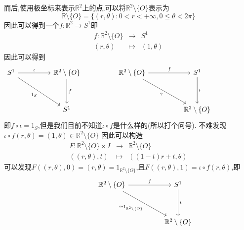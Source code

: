 \documentclass{article}
\begin{document}
\begin{example}
    而后,使用极坐标来表示$\mathbb{R}^2$上的点,可以将$\mathbb{R}^2 \setminus\{O\}$表示为
    $$
    \mathbb{R}\setminus\{O\} = \{(r,\theta): 0 < r <+\infty,0\leq \theta <2\pi\}
    $$
    因此可以得到一个$f : \mathbb{R}^2 \to S^1$即
    \begin{eqnarray*}
        f : \mathbb{R}^2\setminus\{O\} &\to& S^1\\
        (r,\theta) &\mapsto& (1,\theta)
        \end{eqnarray*}
    因此可以得到
    \[\begin{tikzcd}
	{S^1} && {\mathbb{R}^2\setminus\{O\}} && {\mathbb{R}^2\setminus\{O\}} && {S^1} \\
	\\
	&& {S^1} &&&& {\mathbb{R}^2\setminus\{O\}} 
	&& {}
	\arrow["f", from=1-3, to=3-3]
	\arrow["\iota", from=1-1, to=1-3]
	\arrow["{1_{S}}"', from=1-1, to=3-3]
	\arrow["f", from=1-5, to=1-7]
	\arrow["\iota", from=1-7, to=3-7]
	\arrow["{?}"', from=1-5, to=3-7]
\end{tikzcd}\]
    即$f \circ \iota = 1_S$,但是我们目前不知道$\iota \circ f$是什么样的(所以打个问号).
    不难发现$\iota \circ f(r,\theta) = (1,\theta) \in \mathbb{R}^2 \setminus \{O\}$
    因此可以构造
    \begin{eqnarray*}
        F : \mathbb{R}^2\setminus\{O\}\times I &\to& \mathbb{R}^2 \setminus\{O\}\\
        ((r,\theta),t) &\mapsto& ((1-t)r+t,\theta)
        \end{eqnarray*}
        可以发现$F((r,\theta),0) = (r,\theta) = 1_{\mathbb{R}^2\setminus\{O\}}$,且$F((r,\theta),1) = \iota \circ f(r,\theta)$,即
        \[\begin{tikzcd}
	&& {\mathbb{R}^2\setminus\{O\}} && {S^1} \\
	\\
	&&&& {\mathbb{R}^2\setminus\{O\}} 
	{}
	\arrow["f", from=1-3, to=1-5]
	\arrow["\iota", from=1-5, to=3-5]
	\arrow["{\simeq 1_{\mathbb{R}^2\setminus\{O\}}}"', from=1-3, to=3-5]
\end{tikzcd}\]
    \label{Exa:2.2.4}
\end{example}
\end{document}
